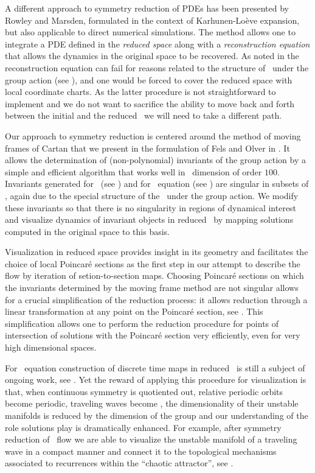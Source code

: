 A different approach to symmetry reduction of PDEs has been
presented by Rowley and
Marsden, formulated in the
context of {Karhunen-Lo\`{e}ve} expansion, but also applicable
to direct numerical simulations.
The method allows one to integrate a PDE defined in the
\emph{reduced space} along with a \emph{reconstruction
equation} that allows the dynamics in the original space to
be recovered. As noted in
 the reconstruction
equation can fail for reasons related to the structure of
\statesp\ under the group action (see ),
and one would be forced to cover the reduced space with local
coordinate charts. As the latter procedure is not
straightforward to implement and we do not want to sacrifice
the ability to move back and forth between the initial and
the reduced \statesp\ we will need to take a different path.

Our approach to symmetry reduction is centered around the
method of moving frames of Cartan that we
present in the formulation of Fels and Olver
in . It allows the determination of
(non-polynomial) invariants of the group action by a simple
and efficient algorithm that works well in \statesp\
dimension of order $100$. Invariants generated for \CLe\ (see
) and for \KS\ equation (see
) are singular in subsets of \statesp,
again due to the special structure of the \statesp\ under the
group action. We modify these invariants so that there is no
singularity in regions of dynamical interest and visualize
dynamics of invariant objects in reduced \statesp\ by mapping
solutions computed in the original space to this basis.


Visualization in reduced space provides insight in its
geometry and facilitates the choice of local Poincar\'e
sections as the first step in our attempt to describe the
flow by iteration of setion-to-section maps.
Choosing Poincar\'e sections on which the invariants
determined by the moving frame method are not singular allows
for a crucial simplification of the reduction process: it
allows reduction through a linear transformation at
any point on the Poincar\'e section, see .
This simplification allows one to perform the reduction
procedure for points of intersection of solutions with the
Poincar\'e section very efficiently, even for very high
dimensional spaces.

For \KS\ equation construction of discrete time maps in
reduced \statesp\ is still a subject of ongoing work, see
. Yet the reward of applying this
procedure for visualization is that, when continuous symmetry
is quotiented out, relative periodic orbits become periodic,
traveling waves become \eqva, the dimensionality of their
unstable manifolds is reduced by the dimension of the group
and our understanding of the role solutions play is
dramatically enhanced.
For example, after symmetry reduction of
\KS\ flow we are able to visualize the unstable manifold of a
traveling wave in a compact manner and connect it to the
topological mechanisms associated to recurrences within the
``chaotic attractor'', see .

